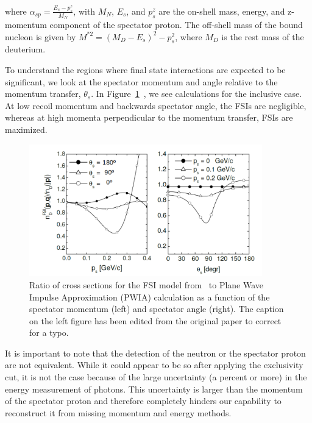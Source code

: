 where $\alpha_{sp} = \frac{E_{s} - p^{z}_{s}}{M_N}$, with $M_N$, $E_{s}$, and 
$p^{z}_{s}$ are the on-shell mass, energy, and z-momentum component of the 
spectator proton. The off-shell mass of the bound nucleon is given by $M^{*2} = 
(M_D - E_{s})^{2} - p^{2}_{s}$, where $M_D$ is the rest mass of the deuterium.

To understand the regions where final state interactions are expected to be 
significant, we look at the spectator momentum and angle relative to the 
momentum transfer, $\theta_{s}$.  In 
Figure~\ref{fig:deuteronFSI}~\cite{CiofidegliAtti:2003pb,CiofidegliAtti:2002as}, 
we see calculations for the inclusive case.  At low recoil momentum and 
backwards spectator angle, the FSIs are negligible, whereas at high momenta 
perpendicular to the momentum transfer, FSIs are maximized.

\begin{figure}
   \centering
   \includegraphics[width=0.9\textwidth]{figures/edit_FSI_quasielastic_Atti_2003.pdf}
   \caption{\label{fig:deuteronFSI} Ratio of cross sections for the FSI model 
   from~\cite{CiofidegliAtti:2003pb} to Plane Wave Impulse Approximation (PWIA) 
   calculation as a function of the spectator momentum (left) and spectator 
   angle (right). The caption on the left figure has been edited from the 
   original paper to correct for a typo.}
\end{figure}

It is important to note that the detection of the neutron or the spectator 
proton are not equivalent. While it could appear to be so after applying the 
exclusivity cut, it is not the case because of the large uncertainty (a percent 
or more) in the energy measurement of photons. This uncertainty is larger
than the momentum of the spectator proton and therefore completely hinders our 
capability to reconstruct it from missing momentum and energy methods.

